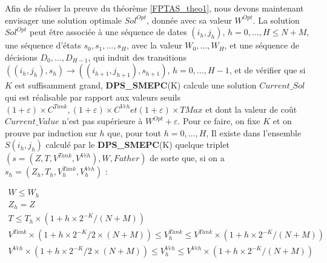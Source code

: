 Afin de réaliser la preuve du théorème \ref{FPTAS_theo1}, nous devons maintenant envisager une solution optimale $Sol^{Opt}$, donnée avec sa valeur $W^{Opt}$. La solution $Sol^{Opt}$ peut être associée à une séquence de dates $(i_h, j_h)$, $h = 0, \dots, H \leq N + M$, une séquence d'états $s_0, s_1, \dots, s_H$, avec la valeur $W_0, \dots, W_H$, et une séquence de décisions $D_0, \dots, D_{H-1}$, qui induit des transitions $((i_h, j_h) , s_h) \rightarrow ((i_{h + 1}, j_{h + 1}) , s_{h + 1})$, $h = 0, \dots, H - 1$, et de vérifier que si $K$ est suffisamment grand, \textbf{DPS\_SMEPC}(K) calcule une solution $Current\_Sol$ qui est réalisable par rapport aux valeurs seuils $(1 + \varepsilon)\times C^{Tank}, (1 + \varepsilon )\times C^{Veh} et (1 + \varepsilon)\times TMax$ et dont la valeur de coût $Current\_Value$ n'est pas supérieure à $W^{Opt} + \varepsilon$. Pour ce faire, on fixe $K$ et on prouve par induction sur $h$ que, pour tout $h = 0, \dots, H$,
Il existe dans l'ensemble $S(i_h, j_h)$ calculé par le \textbf{DPS\_SMEPC}(K) quelque triplet $(s = (Z, T, V^{Tank} , V^{Veh}), W, Father)$ de sorte que, si on a $s_h = (Z_h, T_h, V^{Tank}_h, V^{Veh}_h)$ :	

\begin{subequations}
	\begin{align}
	\label{22}	W\leq W_h&  & \\ 
	\label{23}	Z_h=Z&  & \\
	\label{26}	T\leq T_h \times (1+h\times 2^{-K}/(N+M))&  & \\
	\label{24}	V^{Tank}\times (1+h\times 2^{-K}/2\times (N+M)) \leq V^{Tank}_h \leq V^{Tank} \times (1+h\times 2^{-K}/(N+M))&  &\\
	\label{25}	V^{Veh} \times (1+h\times 2^{-K}/2\times (N+M)) \leq V^{Veh}_h  \leq V^{Veh}\times (1+h\times 2^{-K}/(N+M))&  & 
	\end{align}
\end{subequations}

